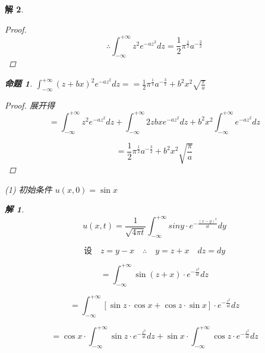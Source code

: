 \documentclass[12pt,a4paper]{article}
\newtheorem*{solution}{解}
\newtheorem{example}{命题}
\begin{document}
\begin{solution}
\begin{proof}
	\begin{equation*}
		\therefore \int_{-\infty}^{+\infty} z^2 e^{-a z^2} dz = \frac{1}{2} \pi^{\frac{1}{2}} a^{-\frac{3}{2}}
	\end{equation*}
		\end{proof}
		
		

		\begin{example}\label{ex:5}
$	\int_{-\infty}^{+\infty} (z + bx)^2 e^{-a z^2} dz=	= \frac{1}{2} \pi^{\frac{1}{2}} a^{-\frac{3}{2}} + b^2 x^2 \sqrt{\frac{\pi}{a}}$
\end{example}

\begin{proof}
	展开得
	\begin{equation*}
		= \int_{-\infty}^{+\infty} z^2 e^{-a z^2} dz + \int_{-\infty}^{+\infty} 2 z b x e^{-a z^2} dz + b^2 x^2 \int_{-\infty}^{+\infty} e^{-a z^2} dz
	\end{equation*}
	
	\begin{equation*}
		= \frac{1}{2} \pi^{\frac{1}{2}} a^{-\frac{3}{2}} + b^2 x^2 \sqrt{\frac{\pi}{a}}
	\end{equation*}
	
		\end{proof}
	
	
	\newpage
(1) 初始条件 \( u(x,0) = \sin x \)
	
	\begin{solution}
		\begin{equation*}
			u(x,t)=\frac{1}{\sqrt{4\pi t}}\int_{-\infty}^{+\infty}siny\cdot e^{-\frac{(x-y)^2}{4t}}dy
		\end{equation*}
		
		\begin{equation*}
			\text{设} \quad z = y - x \quad \therefore \quad y = z + x \quad dz = dy
		\end{equation*}
		
		\begin{equation*}
			= \int_{-\infty}^{+\infty} \sin(z + x) \cdot e^{-\frac{z^2}{4t}} dz
		\end{equation*}
		
		\begin{equation*}
			= \int_{-\infty}^{+\infty} [\sin z \cdot \cos x + \cos z \cdot \sin x] \cdot e^{-\frac{z^2}{4t}} dz
		\end{equation*}
		
		\begin{equation*}
			= \cos x \cdot \int_{-\infty}^{+\infty} \sin z \cdot e^{-\frac{z^2}{4t}} dz + \sin x \cdot \int_{-\infty}^{+\infty} \cos z \cdot e^{-\frac{z^2}{4t}} dz
		\end{equation*}
		

\end{solution}
\end{solution}
\end{document}
